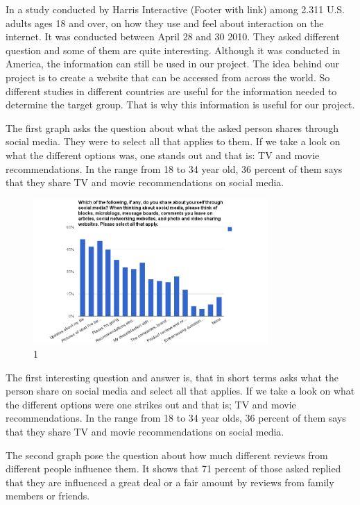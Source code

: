 In a study conducted by Harris Interactive (Footer with link) among 2.311 U.S. adults ages 18 and over, on how they use and feel about interaction on the internet. It was conducted between April 28 and 30 2010. They asked different question and some of them are quite interesting.
Although it was conducted in America, the information can still be used in our project. The idea behind our project is to create a website that can be accessed from across the world. So different studies in different countries are useful for the information needed to determine the target group. That is why this information is useful for our project.

The first graph asks the question about what the asked person shares through social media. They were to select all that applies to them. If we take a look on what the different options was, one stands out and that is: TV and movie recommendations. In the range from 18 to 34 year old, 36 percent of them says that they share TV and movie recommendations on social media.

\begin{figure}[htb]
\centering
\includegraphics[width=0.8\textwidth]{Images/teori1.png}
\caption{1}
\label{Teori1}
\end{figure}

The first interesting question and answer is, that in short terms asks what the person share on social media and select all that applies. If we take a look on what the different options were one strikes out and that is; TV and movie recommendations. In the range from 18 to 34 year olds, 36 percent of them says that they share TV and movie recommendations on social media.

The second graph pose the question about how much different reviews from different people influence them. It shows that 71 percent of those asked replied that they are influenced a great deal or a fair amount by reviews from family members or friends. 

